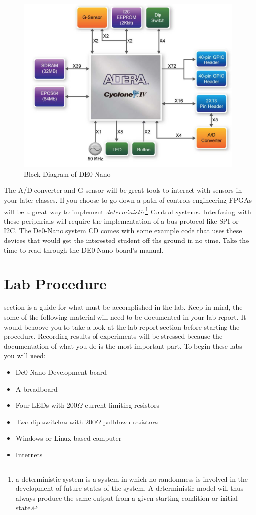       \begin{figure}[htpb]
        \includegraphics[width=.48\textwidth]{Images/DEONanoBlockDiagram.png}
        \caption{Block Diagram of DE0-Nano \cite{DE0Manual}}
        \label{DEOBlockDia}
      \end{figure}
      The A/D converter and G-sensor will be great tools to interact with sensors in your later classes. If you choose to go down a path of controls engineering FPGAs will be a great way to implement {\it deterministic}\footnote{a deterministic system is a system in which no randomness is involved in the development of future states of the system. A deterministic model will thus always produce the same output from a given starting condition or initial state.\cite{DynamicSystems}} Control systems. Interfacing with these periphrials will require the implementation of a bus protocol like SPI or I2C. The De0-Nano system CD comes with some example code that uses these devices that would get the interested student off the ground in no time. Take the time to read through the DE0-Nano board's manual.

  \section{Lab Procedure}
     section is a guide for what must be accomplished in the lab. Keep in mind, the some of the following material will need to be documented in your lab report. It would behoove you to take a look at the lab report section before starting the procedure. Recording results of experiments will be stressed because the documentation of what you do is the most important part. To begin these labs you will need:
    \begin{itemize}
      \item De0-Nano Development board
      \item A breadboard
      \item Four LEDs with 200$\Omega$ current limiting resistors
      \item Two dip switches with 200$\Omega$ pulldown resistors
      \item Windows or Linux based computer
      \item Internets
    \end{itemize}
    
